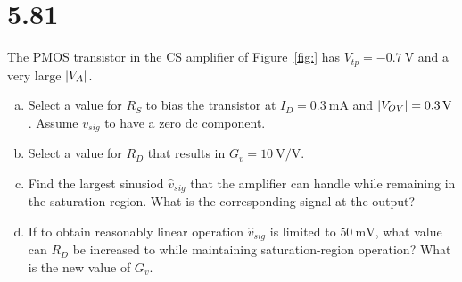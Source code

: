 \documentclass[12pt, a4paper]{article}
\begin{document}
\section{5.81}
The PMOS transistor in the CS amplifier of Figure~\ref{fig:} has $V_{tp} = \SI{-0.7}{\V}$ and a very large $\lvert V_A\rvert$.
\begin{enumerate}[(a)]
  \item Select a value for $R_S$ to bias the transistor at $I_D = \SI{0.3}{\mA}$ and $\lvert V_{OV}\rvert = \SI{0.3}{V}$. Assume $v_{sig}$ to have a zero dc component.
  \item Select a value for $R_D$ that results in $G_v = \SI{10}{\V\per\V}$.
  \item Find the largest sinusiod $\hat{v}_{sig}$ that the amplifier can handle while remaining in the saturation region. What is the corresponding signal at the output?
  \item If to obtain reasonably linear operation $\hat{v}_{sig}$ is limited to $\SI{50}{\mV}$, what value can $R_D$ be increased to while maintaining saturation-region operation? What is the new value of $G_v$.
\end{enumerate}
\end{document}
